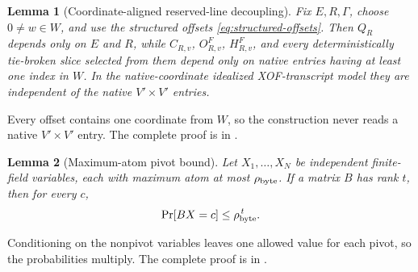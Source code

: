 \documentclass[11pt]{article}
\newtheorem{lemma}[lemma]{Lemma}
\begin{document}
\begin{lemma}[Coordinate-aligned reserved-line decoupling]
\label{lem:reserved-decoupling}
Fix $E,R,\Gamma$, choose $0\ne w\in W$, and use the structured offsets
\eqref{eq:structured-offsets}.  Then $Q_R$ depends only on $E$ and $R$, while
$C_{R,v}$, $O^F_{R,v}$, $H^F_{R,v}$, and every deterministically tie-broken
slice selected from them depend only on native entries having at least one
index in $W$.  In the native-coordinate idealized XOF-transcript model they are
independent of the native $V'\times V'$ entries.
\end{lemma}

Every offset contains one coordinate from $W$, so the construction never reads
a native $V'\times V'$ entry.  The complete proof is in
.

\begin{lemma}[Maximum-atom pivot bound]\label{lem:max-atom-pivot}
Let $X_1,\ldots,X_N$ be independent finite-field variables, each with maximum
atom at most $\rho_{\rm byte}$.  If a matrix $B$ has rank $t$, then for every
$c$,
\[
 \Pr[BX=c]\le\rho_{\rm byte}^{\,t}.
\]
\end{lemma}

Conditioning on the nonpivot variables leaves one allowed value for each pivot,
so the probabilities multiply.  The complete proof is in
.
\end{document}
